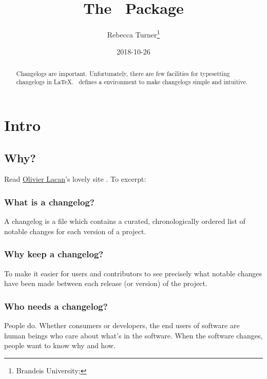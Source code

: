 \documentclass{ltxdoc}
\author{Rebecca Turner\thanks{Brandeis University; \email{rebeccaturner@brandeis.edu}}}
\title{The \cl\ Package}
\date{2018-10-26}
\begin{document}
\maketitle

\begin{abstract}
	Changelogs are important. Unfortunately, there are few facilities
	for typesetting changelogs in \LaTeX. \cl\ defines a 
	environment to make changelogs simple and intuitive.
\end{abstract}


\tableofcontents
\vfill
\pagebreak

\section{Intro}

\subsection{Why?}

Read \href{https://olivierlacan.com/}{Olivier Lacan}'s lovely site
. To excerpt:

\begin{adjustwidth}{1in}{1in}
	\subsubsection{What is a changelog?}
	A changelog is a file which contains a curated, chronologically
	ordered list of notable changes for each version of a project.

	\subsubsection{Why keep a changelog?}
	To make it easier for users and contributors to see precisely what
	notable changes have been made between each release (or version) of
	the project.

	\subsubsection{Who needs a changelog?}
	People do. Whether consumers or developers, the end users of
	software are human beings who care about what's in the software.
	When the software changes, people want to know why and how.
\end{adjustwidth}
\end{document}

